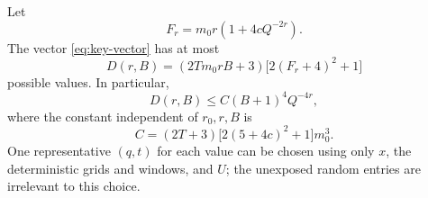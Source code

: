 \begin{lemma}\label{lem:representatives}
Let
\begin{equation}\label{eq:F-count}
 F_r=m_0r(1+4cQ^{-2r}).
\end{equation}
The vector \eqref{eq:key-vector} has at most
\begin{equation}\label{eq:D-count}
 D(r,B)=(2Tm_0rB+3)\bigl[2(F_r+4)^2+1\bigr]
\end{equation}
possible values. In particular,
\begin{equation}\label{eq:D-coarse}
 D(r,B)\le C(B+1)^4Q^{-4r},
\end{equation}
where the constant independent of $r_0,r,B$ is
\begin{equation}\label{eq:C-count}
 C=(2T+3)\bigl[2(5+4c)^2+1\bigr]m_0^3.
\end{equation}
One representative $(q,t)$ for each value can be chosen using only
$x$, the deterministic grids and windows, and $U$; the unexposed random
entries are irrelevant to this choice.
\end{lemma}

